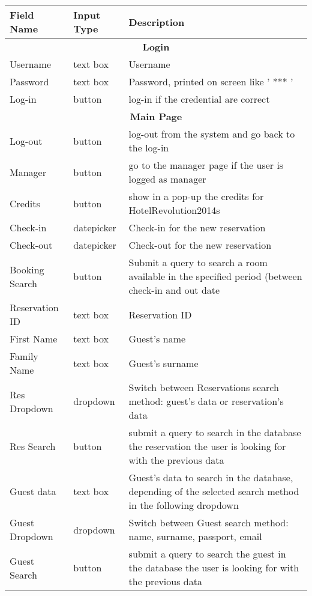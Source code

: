 \documentclass{article}
\begin{document}
\begin{center}
	\begin{longtable}{| l | l | p{7cm} |}
	\hline
	\textbf{Field Name} & \textbf{Input Type} & \textbf{Description} \\ 
	\hline \hline	
	\multicolumn{3}{|c|}{\textbf{Login}} \\ 
	\hline \hline
	Username 		& text box 		& Username \\ 
	Password 		& text box 		& Password, printed on screen like ' *** ' \\
	Log-in			& button 		& log-in if the credential are correct \\ 
	\hline \hline
	\multicolumn{3}{|c|}{\textbf{Main Page}} \\ 
	\hline \hline
	Log-out			& button		& log-out from the system and go back to the log-in \\
	Manager			& button		& go to the manager page if the user is logged as manager \\
	Credits			& button		& show in a pop-up the credits for HotelRevolution2014s \\
	\hline
	Check-in		& datepicker 	& Check-in for the new reservation \\ 
	Check-out		& datepicker 	& Check-out for the new reservation \\ 
	Booking Search	& button		& Submit a query to search a room available in the specified period (between check-in and out date \\
	\hline
	Reservation ID	& text box 		& Reservation ID \\ 
	First Name 		& text box	 	& Guest's name \\ 
	Family Name	 	& text box 		& Guest's surname \\ 
	Res Dropdown 	& dropdown 		& Switch between Reservations search method: guest's data or reservation's data \\ 
	Res Search		& button		& submit a query to search in the database the reservation the user is looking for with the previous data \\
	\hline
	Guest data		& text box		& Guest's data to search in the database, depending of the selected search method in the following dropdown \\ 
	Guest Dropdown	& dropdown 		& Switch between Guest search method: name, surname, passport, email \\ 
	Guest Search	& button		& submit a query to search the guest in the database the user is looking for with the previous data \\

\end{longtable}
\end{center}
\end{document}
